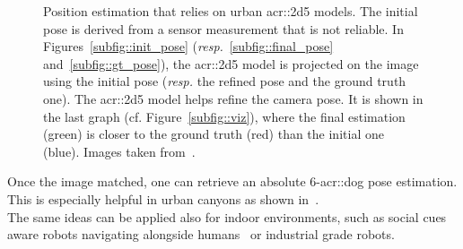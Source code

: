 \begin{figure}[htpb]
{                }
                {
                    \caption[
                        Position estimation that relies on urban \gls{acr::2d5} models.
                    ]{
                        \label{fig::navigation}
                        Position estimation that relies on urban \gls{acr::2d5} models.
                        The initial pose is derived from a sensor measurement that is not reliable.
                        In Figures~\ref{subfig::init_pose} (\textit{resp.}~\ref{subfig::final_pose} and~\ref{subfig::gt_pose}), the \gls{acr::2d5} model is projected on the image using the initial pose (\textit{resp.} the refined pose and the ground truth one).
                        The \gls{acr::2d5} model helps refine the camera pose.
                        It is shown in the last graph (cf. Figure~\ref{subfig::viz}), where the final estimation (green) is closer to the ground truth (red) than the initial one (blue).
                        Images taken from~\parencite{armagan2017semantic}.
                    }
                }
            \end{figure}

            Once the image matched, one can retrieve an absolute 6-\gls{acr::dog} pose estimation.
            This is especially helpful in urban canyons as shown in~\parencite{piasco2018survey}.\\
            The same ideas can be applied also for indoor environments, such as social cues aware robots navigating alongside humans~\parencite{gupta2018social} or industrial grade robots\addref.
       
